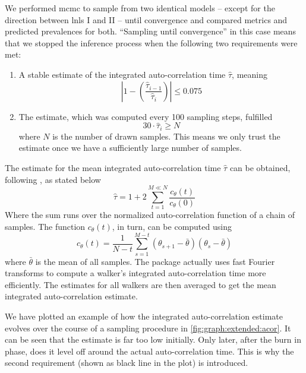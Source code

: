 \documentclass[\relativeRoot/main.tex]{subfiles}
\begin{document}
We performed \gls{mcmc} to sample from two identical models -- except for the direction between \glspl{lnl} I and II -- until convergence and compared metrics and predicted prevalences for both. ``Sampling until convergence'' in this case means that we stopped the inference process when the following two requirements were met:

\begin{enumerate}
    \item A stable estimate of the integrated auto-correlation time $\hat{\tau}$, meaning
    \begin{equation}
        \left| 1 - \left( \frac{\hat{\tau}_{i-1}}{\hat{\tau}_i} \right) \right| \leq 0.075
    \end{equation}
    \item The estimate, which was computed every 100 sampling steps, fulfilled
    \begin{equation}
        30 \cdot \hat{\tau}_i \geq N
    \end{equation}
    where $N$ is the number of drawn samples. This means we only trust the estimate once we have a sufficiently large number of samples.
\end{enumerate}

The estimate for the mean integrated auto-correlation time $\hat{\tau}$ can be obtained, following , as stated below
%
\begin{equation}
    \hat{\tau} = 1 + 2 \sum_{t=1}^{M \ll N}\frac{ c_\theta(t) }{ c_\theta(0) }
\end{equation}
%
Where the sum runs over the normalized auto-correlation function of a chain of samples. The function $c_\theta(t)$, in turn, can be computed using
%
\begin{equation}
    c_\theta(t) = \frac{1}{N-t} \sum_{s=1}^{M-t}{ \left( \theta_{s+1} - \bar{\theta} \right) \left( \theta_s - \bar{\theta} \right) }
\end{equation}
%
where $\bar{\theta}$ is the mean of all samples. The  package actually uses fast Fourier transforms to compute a walker's integrated auto-correlation time more efficiently. The estimates for all walkers are then averaged to get the mean integrated auto-correlation estimate.

We have plotted an example of how the integrated auto-correlation estimate evolves over the course of a sampling procedure in \cref{fig:graph:extended:acor}. It can be seen that the estimate is far too low initially. Only later, after the burn in phase, does it level off around the actual auto-correlation time. This is why the second requirement (shown as black line in the plot) is introduced.
\end{document}
